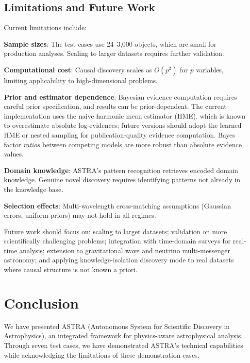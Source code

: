\documentclass[usenatbib]{rasti}
\begin{document}
\subsection{Limitations and Future Work}

Current limitations include:
\begin{description}
\item \textbf{Sample sizes}: The test cases use 24--3,000 objects, which are small for production analyses. Scaling to larger datasets requires further validation.
\item \textbf{Computational cost}: Causal discovery scales as $O(p^2)$ for $p$ variables, limiting applicability to high-dimensional problems.
\item \textbf{Prior and estimator dependence}: Bayesian evidence computation requires careful prior specification, and results can be prior-dependent. The current implementation uses the naive harmonic mean estimator (HME), which is known to overestimate absolute log-evidences; future versions should adopt the learned HME or nested sampling \citep{skilling2004} for publication-quality evidence computation. Bayes factor \emph{ratios} between competing models are more robust than absolute evidence values.
\item \textbf{Domain knowledge}: ASTRA's pattern recognition retrieves encoded domain knowledge. Genuine novel discovery requires identifying patterns not already in the knowledge base.
\item \textbf{Selection effects}: Multi-wavelength cross-matching assumptions (Gaussian errors, uniform priors) may not hold in all regimes.
\end{description}

Future work should focus on: scaling to larger datasets; validation on more scientifically challenging problems; integration with time-domain surveys for real-time analysis; extension to gravitational wave and neutrino multi-messenger astronomy; and applying knowledge-isolation discovery mode to real datasets where causal structure is not known a priori.

\section{Conclusion}

We have presented ASTRA (Autonomous System for Scientific Discovery in Astrophysics), an integrated framework for physics-aware astrophysical analysis. Through seven test cases, we have demonstrated ASTRA's technical capabilities while acknowledging the limitations of these demonstration cases.
\end{document}
